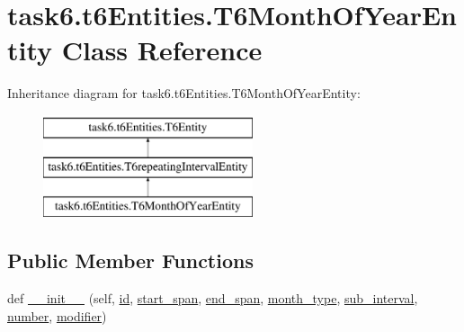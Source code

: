 \hypertarget{classtask6_1_1t6Entities_1_1T6MonthOfYearEntity}{}\section{task6.\+t6\+Entities.\+T6\+Month\+Of\+Year\+Entity Class Reference}
\label{classtask6_1_1t6Entities_1_1T6MonthOfYearEntity}
Inheritance diagram for task6.\+t6\+Entities.\+T6\+Month\+Of\+Year\+Entity\+:\begin{figure}[H]
\begin{center}
\leavevmode
\includegraphics[height=3.000000cm]{classtask6_1_1t6Entities_1_1T6MonthOfYearEntity}
\end{center}
\end{figure}
\subsection*{Public Member Functions}
\begin{DoxyCompactItemize}
\item 
def \hyperlink{classtask6_1_1t6Entities_1_1T6MonthOfYearEntity_aafc8822d1941f3f61d379af1cc34fa59}{\+\_\+\+\_\+init\+\_\+\+\_\+} (self, \hyperlink{classtask6_1_1t6Entities_1_1T6Entity_afeeced8134bb3ebe0cfecc64d0ab46a4}{id}, \hyperlink{classtask6_1_1t6Entities_1_1T6Entity_a52779e9af8864dc98e8b02fc5b9b041a}{start\+\_\+span}, \hyperlink{classtask6_1_1t6Entities_1_1T6Entity_aeb402200b156cd9562c5111dfe777b98}{end\+\_\+span}, \hyperlink{classtask6_1_1t6Entities_1_1T6MonthOfYearEntity_a48a849892eb9cbc6fce3833f059989a7}{month\+\_\+type}, \hyperlink{classtask6_1_1t6Entities_1_1T6MonthOfYearEntity_ac2823d70e532c8032939f67a84c5efbc}{sub\+\_\+interval}, \hyperlink{classtask6_1_1t6Entities_1_1T6MonthOfYearEntity_a6b6c3d56962c165f446304d82d06acb0}{number}, \hyperlink{classtask6_1_1t6Entities_1_1T6MonthOfYearEntity_a1720393c88572b80a70fd30bbccea2ab}{modifier})
\end{DoxyCompactItemize}
